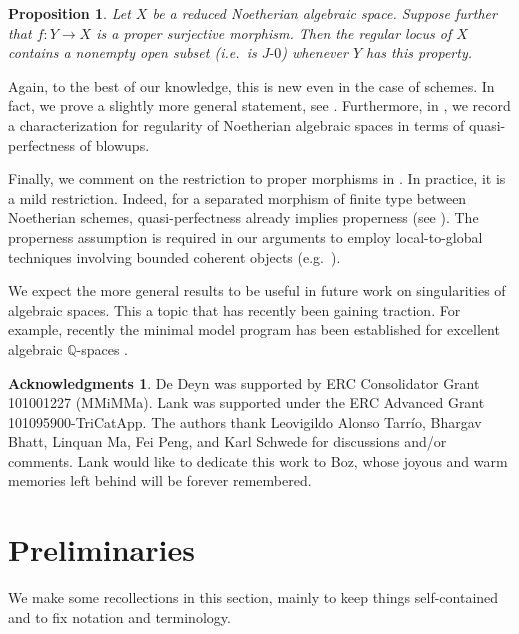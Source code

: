 \documentclass[11pt]{amsart}
\theoremstyle{plain}
\newtheorem*{proposition*}{Proposition}
\theoremstyle{definition}
\newtheorem*{ack}{Acknowledgments}
\numberwithin{equation}{section}
\numberwithin{theorem}{section}
\begin{document}
\begin{proposition*}
    Let $X$ be a reduced Noetherian algebraic space. Suppose further that $f\colon Y \to X$ is a proper surjective morphism.
    Then the regular locus of $X$ contains a nonempty open subset (i.e.\ is $J\textrm{-}0$) whenever $Y$ has this property.
\end{proposition*}

Again, to the best of our knowledge, this is new even in the case of schemes. In fact, we prove a slightly more general statement, see . Furthermore, in , we record a characterization for regularity of Noetherian algebraic spaces in terms of quasi-perfectness of blowups.

Finally, we comment on the restriction to proper morphisms in . In practice, it is a mild restriction. Indeed, for a separated morphism of finite type between Noetherian schemes, quasi-perfectness already implies properness (see \cite[Proposition 0.20]{Neeman:2021}). The properness assumption is required in our arguments to employ local-to-global techniques involving bounded coherent objects (e.g.\ \cite[Theorem 4.1]{Avramov/Iyengar/Lipman:2010}).

We expect the more general results to be useful in future work on singularities of algebraic spaces. This a topic that has recently been gaining traction. For example, recently the minimal model program has been established for excellent algebraic $\mathbb{Q}$-spaces \cite{Lyu/Murayama:2022}. 

\begin{ack}
    De Deyn was supported by ERC Consolidator Grant 101001227 (MMiMMa).
    Lank was supported under the ERC Advanced Grant 101095900-TriCatApp. The authors thank Leovigildo Alonso Tarr\'{i}o, Bhargav Bhatt, Linquan Ma, Fei Peng, and Karl Schwede for discussions and/or comments. Lank would like to dedicate this work to Boz, whose joyous and warm memories left behind will be forever remembered.
\end{ack}

\section{Preliminaries}
\label{sec:prelim}

We make some recollections in this section, mainly to keep things self-contained and to fix notation and terminology.
\end{document}
